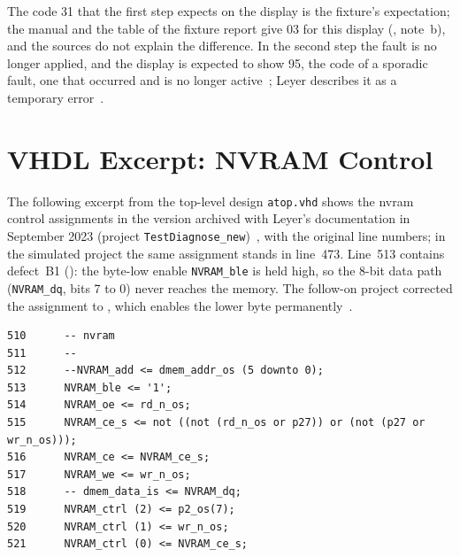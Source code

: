The code 31 that the first step expects on the display is the fixture's expectation; the manual and the table of the fixture report give 03 for this display (, note~b), and the sources do not explain the difference. In the second step the fault is no longer applied, and the display is expected to show 95, the code of a sporadic fault, one that occurred and is no longer active~\cite[Tab.~2, Sec.~9.3]{dolata2023}; Leyer describes it as a temporary error~\cite[Sec.~5.1.3]{leyer2023}.

\section{VHDL Excerpt: NVRAM Control}
\label{sec:app_vhdl_testbenches}

The following excerpt from the top-level design \texttt{atop.vhd} shows the \gls{nvram} control assignments in the version archived with Leyer's documentation in September 2023 (project \texttt{TestDiagnose\_new})~\cite{leyer2023}, with the original line numbers; in the simulated project the same assignment stands in line~473. Line~513 contains defect~B1 (): the byte-low enable \texttt{NVRAM\_ble} is held high, so the 8-bit data path (\texttt{NVRAM\_dq}, bits 7 to 0) never reaches the memory. The follow-on project corrected the assignment to \texttt{\textquotesingle}, which enables the lower byte permanently~\cite[pp.~14--15]{savchuk2025}.

{\footnotesize
\begin{verbatim}
510      -- nvram
511      --
512      --NVRAM_add <= dmem_addr_os (5 downto 0);
513      NVRAM_ble <= '1';
514      NVRAM_oe <= rd_n_os;
515      NVRAM_ce_s <= not ((not (rd_n_os or p27)) or (not (p27 or wr_n_os)));
516      NVRAM_ce <= NVRAM_ce_s;
517      NVRAM_we <= wr_n_os;
518      -- dmem_data_is <= NVRAM_dq;
519      NVRAM_ctrl (2) <= p2_os(7);
520      NVRAM_ctrl (1) <= wr_n_os;
521      NVRAM_ctrl (0) <= NVRAM_ce_s;
\end{verbatim}
}
